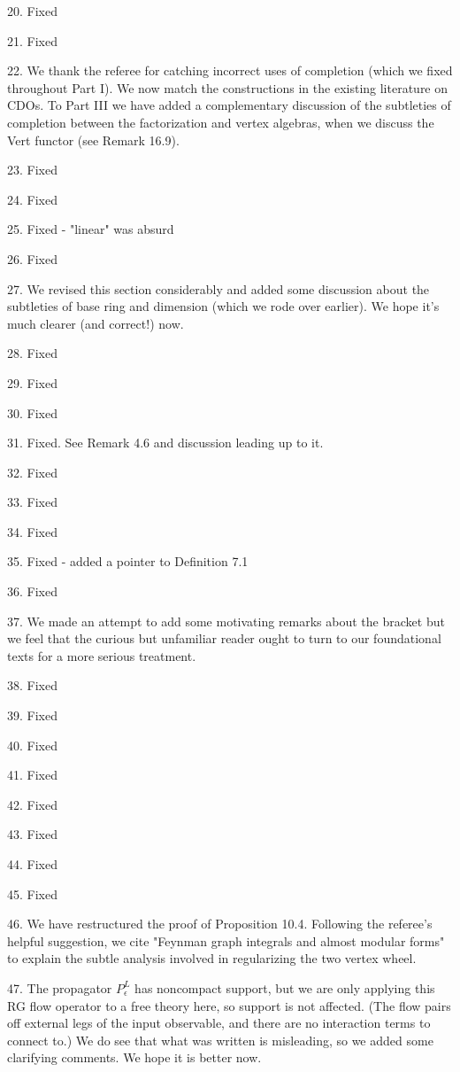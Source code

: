 \documentclass[10pt]{amsart}
\begin{document}
20. Fixed

21. Fixed

22. We thank the referee for catching incorrect uses of completion (which we fixed throughout Part I). We now match the constructions in the existing literature on CDOs. To Part III we have added a complementary discussion of the subtleties of completion between the factorization and vertex algebras, when we discuss the Vert functor (see Remark 16.9).

23. Fixed

24. Fixed

25. Fixed - "linear" was absurd

26. Fixed

27. We revised this section considerably and added some discussion about the subtleties of base ring and dimension (which we rode over earlier). We hope it's much clearer (and correct!) now.

28. Fixed

29. Fixed

30. Fixed

31. Fixed. See Remark 4.6 and discussion leading up to it.

32. Fixed

33. Fixed

34. Fixed

35. Fixed - added a pointer to Definition 7.1

36. Fixed

37. We made an attempt to add some motivating remarks about the bracket but we feel that the curious but unfamiliar reader ought to turn to our foundational texts for a more serious treatment.

38. Fixed

39. Fixed

40. Fixed

41. Fixed

42. Fixed

43. Fixed

44. Fixed

45. Fixed

46. We have restructured the proof of Proposition 10.4.
Following the referee's helpful suggestion, we cite "Feynman graph integrals and almost modular forms" to explain the subtle analysis involved in regularizing the two vertex wheel.

47. The propagator $P^L_\epsilon$ has noncompact support, but we are only applying this RG flow operator to a free theory here, so support is not affected. (The flow pairs off external legs of the input observable, and there are no interaction terms to connect to.) We do see that what was written is misleading, so we added some clarifying comments. We hope it is better now.
\end{document}
